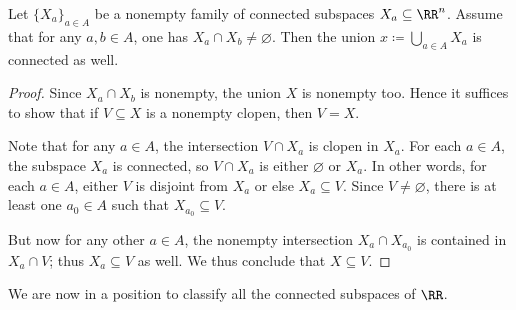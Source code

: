 \begin{prp}%
\label{prp:intersecting_unions_of_connecteds_are_connected}
	Let $\{X_a\}_{a\in A} $ be a nonempty family of connected subspaces $X_a \subseteq \RR^n$.
	Assume that for any $a,b \in A$, one has $X_a\cap X_b \neq \varnothing$.
	Then the union $x \coloneq \bigcup_{a\in A}X_a $ is connected as well.
\end{prp}

\begin{proof}
	Since $X_a \cap X_b$ is nonempty, the union $X$ is nonempty too.
	Hence it suffices to show that if $ V \subseteq X $ is a nonempty clopen, then $ V = X$.
	
	Note that for any $ a\in A$, the intersection $ V \cap X_a $ is clopen in $X_a$.
	For each $ a\in A$, the subspace $X_a$ is connected, so $V \cap X_a$ is either $\varnothing$ or $X_a$.
	In other words, for each $a \in A$, either $V$ is disjoint from $X_a$ or else $X_a \subseteq V$.
	Since $V\neq\varnothing$, there is at least one $ a_0 \in A $ such that $ X_{a_0} \subseteq V$.
	
	But now for any other $a\in A$, the nonempty intersection $X_a \cap X_{a_0}$ is contained in $ X_a \cap V $;
	thus $X_a \subseteq V $ as well.
	We thus conclude that $X \subseteq V$.
\end{proof}

We are now in a position to classify all the connected subspaces of $\RR$.


